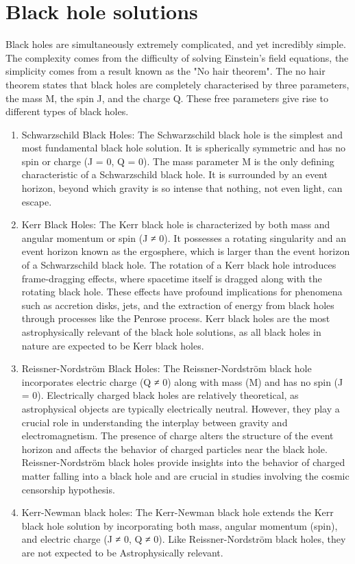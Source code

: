 \section{Black hole solutions}\label{sec:BH soln}

Black holes are simultaneously extremely complicated, and yet incredibly simple. The complexity comes from the difficulty of solving Einstein's field equations, the simplicity comes from a result known as the "No hair theorem". The no hair theorem states that black holes are completely characterised by three parameters, the mass M, the spin J, and the charge Q. These free parameters give rise to different types of black holes.

\begin{enumerate}
    \item Schwarzschild Black Holes: The Schwarzschild black hole is the simplest and most fundamental black hole solution. It is spherically symmetric and has no spin or charge (J = 0, Q = 0). The mass parameter M is the only defining characteristic of a Schwarzschild black hole. It is surrounded by an event horizon, beyond which gravity is so intense that nothing, not even light, can escape. 
    \item Kerr Black Holes: The Kerr black hole is characterized by both mass and angular momentum or spin (J ≠ 0). It possesses a rotating singularity and an event horizon known as the ergosphere, which is larger than the event horizon of a Schwarzschild black hole. The rotation of a Kerr black hole introduces frame-dragging effects, where spacetime itself is dragged along with the rotating black hole. These effects have profound implications for phenomena such as accretion disks, jets, and the extraction of energy from black holes through processes like the Penrose process. Kerr black holes are the most astrophysically relevant of the black hole solutions, as all black holes in nature are expected to be Kerr black holes.
    \item Reissner-Nordström Black Holes: The Reissner-Nordström black hole incorporates electric charge (Q ≠ 0) along with mass (M) and has no spin (J = 0). Electrically charged black holes are relatively theoretical, as astrophysical objects are typically electrically neutral. However, they play a crucial role in understanding the interplay between gravity and electromagnetism. The presence of charge alters the structure of the event horizon and affects the behavior of charged particles near the black hole. Reissner-Nordström black holes provide insights into the behavior of charged matter falling into a black hole and are crucial in studies involving the cosmic censorship hypothesis.
    \item Kerr-Newman  black holes: The Kerr-Newman black hole extends the Kerr black hole solution by incorporating both mass, angular momentum (spin), and electric charge (J ≠ 0, Q ≠ 0). Like Reissner-Nordström black holes, they are not expected to be Astrophysically relevant.
\end{enumerate}


